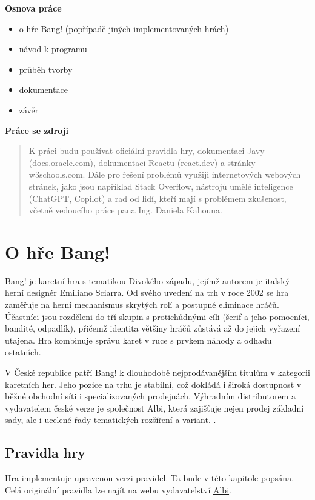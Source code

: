\vspace{1em}

\noindent \textbf{Osnova práce}
\begin{itemize}
    \item o hře Bang! (popřípadě jiných implementovaných hrách)
    \item návod k programu
    \item průběh tvorby
    \item dokumentace
    \item závěr
\end{itemize}

\noindent \textbf{Práce se zdroji}
\begin{quote}

K práci budu používat oficiální pravidla hry, dokumentaci Javy (docs.oracle.com), dokumentaci Reactu (react.dev) a stránky w3schools.com. Dále pro řešení problémů využiji internetových webových stránek, jako jsou například Stack Overflow, nástrojů umělé inteligence (ChatGPT, Copilot) a rad od lidí, kteří mají s problémem zkušenost, včetně vedoucího práce pana Ing. Daniela Kahouna.
\end{quote}


\section{O hře Bang!}
Bang! je karetní hra s tematikou Divokého západu, jejímž autorem je italský herní designér Emiliano Sciarra. Od svého uvedení na trh v roce 2002 se hra zaměřuje na herní mechanismus skrytých rolí a postupné eliminace hráčů. Účastníci jsou rozděleni do tří skupin s protichůdnými cíli (šerif a jeho pomocníci, bandité, odpadlík), přičemž identita většiny hráčů zůstává až do jejich vyřazení utajena. Hra kombinuje správu karet v ruce s prvkem náhody a odhadu ostatních.

V České republice patří Bang! k dlouhodobě nejprodávanějším titulům v kategorii karetních her. Jeho pozice na trhu je stabilní, což dokládá i široká dostupnost v běžné obchodní síti i specializovaných prodejnách. Výhradním distributorem a vydavatelem české verze je společnost Albi, která zajišťuje nejen prodej základní sady, ale i ucelené řady tematických rozšíření a variant. \cite{wikipedia_bang}.
\subsection{Pravidla hry}
Hra implementuje upravenou verzi pravidel. Ta bude v této kapitole popsána. Celá originální pravidla lze najít na webu vydavatelství \href{https://albi.cz/data/files/products/24327/1603711687-bang-pravidla-zakladni-hry.pdf}{Albi}.
